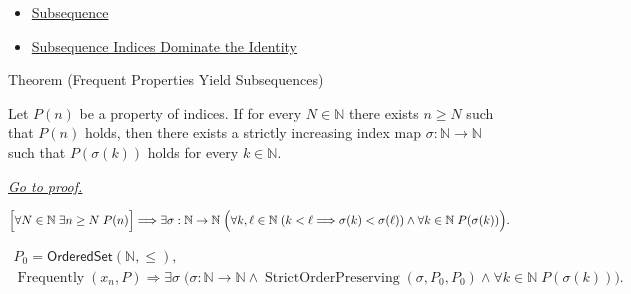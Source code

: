\begin{dependencies}
\begin{itemize}
  \item \hyperref[def:subsequence-of-sequence]{Subsequence}
  \item \hyperref[thm:subsequence-indices-dominate-identity]{Subsequence Indices Dominate the Identity}
\end{itemize}
\end{dependencies}


\begin{theorembox}{Theorem (Frequent Properties Yield Subsequences)}
\begin{theorem}
\label{thm:frequent-properties-yield-subsequences}
Let $P(n)$ be a property of indices. If for every $N\in\mathbb{N}$ there
exists $n\ge N$ such that $P(n)$ holds, then there exists a strictly
increasing index map $\sigma:\mathbb{N}\to\mathbb{N}$ such that
$P(\sigma(k))$ holds for every $k\in\mathbb{N}$.

\smallskip
\noindent
\hyperref[prf:frequent-properties-yield-subsequences]{\textit{Go to proof.}}
\end{theorem}
\end{theorembox}

\begin{remark*}
\[
\Bigl[
\forall N\in\mathbb{N}\;\exists n\ge N\;P(n)
\Bigr]
\Longrightarrow
\exists \sigma:\mathbb{N}\to\mathbb{N}\;
\Bigl(
  \forall k,\ell\in\mathbb{N}\;(k<\ell\Longrightarrow\sigma(k)<\sigma(\ell))
  \land
  \forall k\in\mathbb{N}\;P(\sigma(k))
\Bigr).
\]
\end{remark*}

\begin{remark*}
\[
\begin{gathered}
P_0=\mathsf{OrderedSet}(\mathbb{N},\leq),\\
\operatorname{Frequently}(x_n,P)
\Longrightarrow
\exists \sigma\;\bigl(\sigma\colon\mathbb{N}\to\mathbb{N}
\land
\operatorname{StrictOrderPreserving}(\sigma,P_0,P_0)
\land
\forall k\in\mathbb{N}\;P(\sigma(k))\bigr).
\end{gathered}
\]
\end{remark*}

